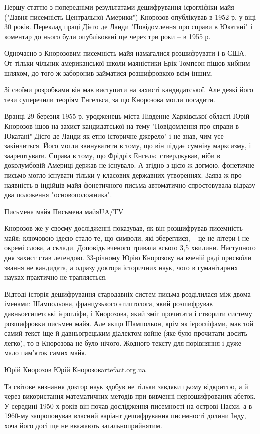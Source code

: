 Першу статтю з попередніми результатами дешифрування ієрогліфіки майя
("Давня писемність Центральної Америки") Кнорозов опублікував в 1952 р. у
віці 30 років. Переклад праці Дієго де Ланди "Повідомлення про справи в
Юкатані" і коментар до нього були опубліковані ще через три роки – в 1955
р.

Одночасно з Кнорозовим писемність майя намагалися розшифрувати і в США.
От тільки чільник американської школи маяністики Ерік Томпсон пішов
хибним шляхом, до того ж заборонив займатися розшифровкою всім іншим.

Зі своїми розробками він мав виступити на захисті кандидатської. Але деякі
його тези суперечили теоріям Енгельса, за що Кнорозова могли посадити.

Вранці 29 березня 1955 р. уродженець міста Південне Харківської області
Юрій Кнорозов ішов на захист кандидатської на тему "Повідомлення про
справи в Юкатані" Дієго де Ланди як етно-історичне джерело" і не знав, чим
усе закінчиться. Його могли звинуватити в тому, що він піддає сумніву
марксизму, і заарештувати. Справа в тому, що Фрідріх Енгельс стверджував,
ніби в доколумбовій Америці держав не існувало. А згідно з цією ж догмою,
фонетичне письмо могло існувати тільки у класових державних утвореннях.
Заява ж про наявність в індійців-майя фонетичного письма автоматично
спростовувала відразу два положення "основоположника".

Письмена майя  Письмена майяUA/TV

Кнорозов же у своєму дослідженні показував, як він розшифрував
писемність майя: ключовою ідеєю стало те, що символи, які збереглися, –
це не літери і не окремі слова, а склади. Доповідь вченого тривала
всього 3,5 хвилини. Наступного дня захист став легендою. 33-річному Юрію
Кнорозову на вченій раді присвоїли звання не кандидата, а одразу доктора
історичних наук, чого в гуманітарних науках практично не трапляється.

Відтоді історія дешифрування стародавніх систем письма розділилася між
двома іменами: Шампольона, французького єгиптолога, який розшифрував
давньоєгипетські ієрогліфи, і Кнорозова, який зміг прочитати і створити
систему розшифровки письмен майя. Але якщо Шампольон, крім як ієрогліфами,
мав той самий текст іще й давньогрецьким діалектом койне (яке було
прочитати досить легко), то в Кнорозова не було нічого. Жодного тексту для
порівняння і дуже мало пам'яток самих майя.

Юрій Кнорозов  Юрій Кнорозовartefact.org.ua

Та світове визнання доктор наук здобув не тільки завдяки цьому відкриттю,
а й через використання математичних методів при вивченні нерозшифрованих
абеток. У середині 1950-х років він почав дослідження писемності на
острові Пасхи, а в 1960-му запропонував власний варіант дешифрування
писемності долини Інду, хоча його досі ще не вважають загальноприйнятим.

